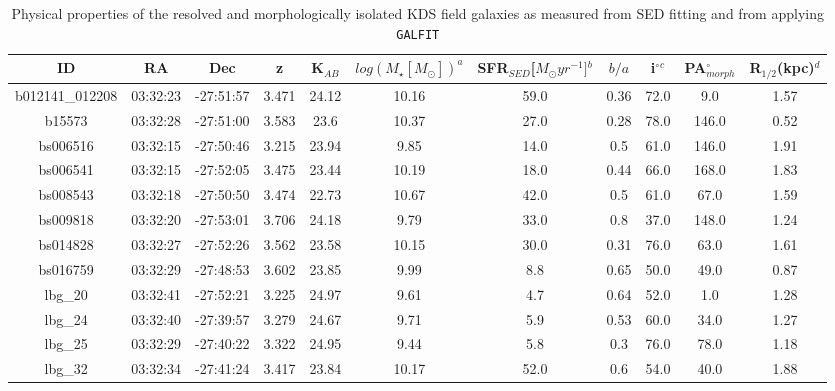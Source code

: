 \documentclass[fleqn,usenatbib]{mn2e}
\begin{document}
\begin{table*}
\centering
\begin{threeparttable}
\caption{Physical properties of the resolved and morphologically isolated KDS field galaxies as measured from SED fitting and from applying {\tt GALFIT} \protect\citep{Peng2010_galfit}}
\label{tab:phys-props}
\begin{tabular}{ccccccccccc}


 \hline
ID              & RA       & Dec       & z     & K$_{AB}$     & $log(M_{\star}[M_{\odot}])^{a}$ & SFR$_{SED}$[$M_{\odot}yr^{-1}]$$^{b}$ & $b/a$ & i$^{\circ}$$^{c}$ & PA$_{morph}^{\circ}$ & R$_{1/2}$(kpc)$^{d}$ \\
 \hline
b012141\_012208 & 03:32:23 & -27:51:57 & 3.471        & 24.12  & 10.16 & 59.0 & 0.36        & 72.0        & 9.0     & 1.57      \\
b15573          & 03:32:28 & -27:51:00 & 3.583        & 23.6   & 10.37 & 27.0 & 0.28        & 78.0        & 146.0   & 0.52      \\
bs006516        & 03:32:15 & -27:50:46 & 3.215        & 23.94  & 9.85  & 14.0 & 0.5         & 61.0        & 146.0   & 1.91      \\
bs006541        & 03:32:15 & -27:52:05 & 3.475       & 23.44  & 10.19 & 18.0 & 0.44        & 66.0        & 168.0   & 1.83      \\
bs008543        & 03:32:18 & -27:50:50 & 3.474        & 22.73  & 10.67 & 42.0 & 0.5         & 61.0        & 67.0    & 1.59      \\
bs009818        & 03:32:20 & -27:53:01 & 3.706        & 24.18  & 9.79  & 33.0 & 0.8         & 37.0        & 148.0   & 1.24      \\
bs014828        & 03:32:27 & -27:52:26 & 3.562        & 23.58  & 10.15 & 30.0 & 0.31        & 76.0        & 63.0    & 1.61      \\
bs016759        & 03:32:29 & -27:48:53 & 3.602       & 23.85  & 9.99  & 8.8  & 0.65        & 50.0        & 49.0    & 0.87      \\
lbg\_20         & 03:32:41 & -27:52:21 & 3.225        & 24.97  & 9.61  & 4.7  & 0.64        & 52.0        & 1.0     & 1.28      \\
lbg\_24         & 03:32:40 & -27:39:57 & 3.279       & 24.67  & 9.71  & 5.9  & 0.53        & 60.0        & 34.0    & 1.27      \\
lbg\_25         & 03:32:29 & -27:40:22 & 3.322        & 24.95  & 9.44  & 5.8  & 0.3         & 76.0        & 78.0    & 1.18      \\
lbg\_32         & 03:32:34 & -27:41:24 & 3.417      & 23.84  & 10.17 & 52.0 & 0.6         & 54.0        & 40.0    & 1.88      \\

\end{tabular}
\end{threeparttable}
\end{table*}
\end{document}
